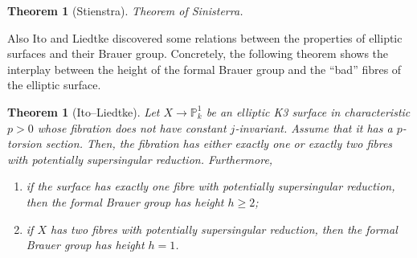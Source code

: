 \documentclass{report}
\newtheorem{theorem}[equation]{Theorem}
\theoremstyle{definition}
\begin{document}
\begin{theorem}[Stienstra]
Theorem of Sinisterra.
\end{theorem}

Also Ito and Liedtke \cite[Theorem~3.5]{ito2011elliptic} discovered some relations between the properties of elliptic surfaces and their Brauer group. Concretely, the following theorem shows the interplay between the height of the formal Brauer group and the ``bad'' fibres of the elliptic surface.

\begin{theorem}[Ito--Liedtke]
Let $X\rightarrow\mathbb{P}_k^1$ be an elliptic K3 surface in characteristic $p>0$ whose fibration does not have constant $j$-invariant. Assume that it has a $p$-torsion section. Then, the fibration has either exactly one or exactly two fibres with potentially supersingular reduction. Furthermore,
\begin{enumerate}[label=\arabic*.]
\item if the surface has exactly one fibre with potentially supersingular reduction, then the formal Brauer group has height $h\geq2$;
\item if $X$ has two fibres with potentially supersingular reduction, then the formal Brauer group has height $h=1$.
\end{enumerate}
\end{theorem}

\nocite{*}
\printbibliography[heading=bibintoc]
\end{document}
